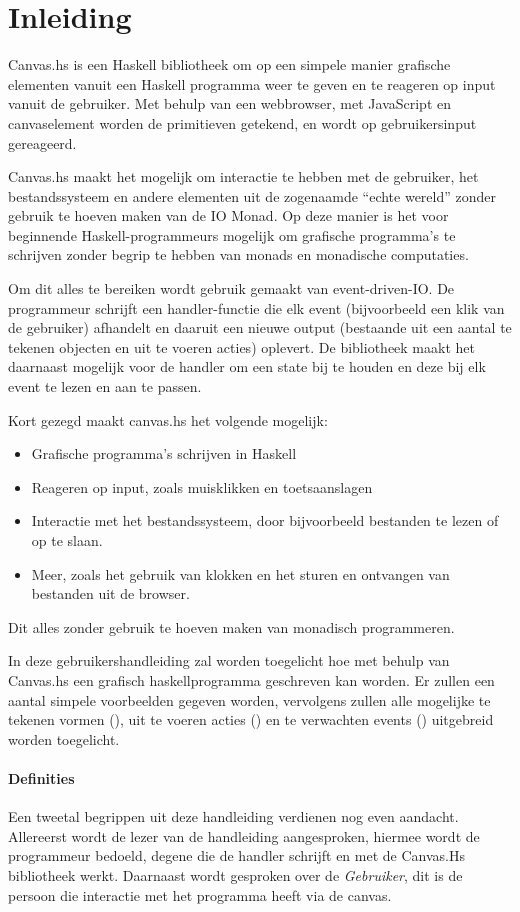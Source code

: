 \section{Inleiding}

Canvas.hs is een Haskell bibliotheek om op een simpele manier grafische elementen vanuit een Haskell programma weer te geven en te reageren op input vanuit de gebruiker. Met behulp van een webbrowser, met JavaScript en canvaselement worden de primitieven getekend, en wordt op gebruikersinput gereageerd.

Canvas.hs maakt het mogelijk om interactie te hebben met de gebruiker, het bestandssysteem en andere elementen uit de zogenaamde ``echte wereld'' zonder gebruik te hoeven maken van de IO Monad. Op deze manier is het voor beginnende Haskell-programmeurs mogelijk om grafische programma's te schrijven zonder begrip te hebben van monads en monadische computaties.

Om dit alles te bereiken wordt gebruik gemaakt van event-driven-IO. De programmeur schrijft een handler-functie die elk event (bijvoorbeeld een klik van de gebruiker) afhandelt en daaruit een nieuwe output (bestaande uit een aantal te tekenen objecten en uit te voeren acties) oplevert. De bibliotheek maakt het daarnaast mogelijk voor de handler om een state bij te houden en deze bij elk event te lezen en aan te passen. 

Kort gezegd maakt canvas.hs het volgende mogelijk:
\begin{itemize}
	\item Grafische programma's schrijven in Haskell
	\item Reageren op input, zoals muisklikken en toetsaanslagen
	\item Interactie met het bestandssysteem, door bijvoorbeeld bestanden te lezen of op te slaan.
	\item Meer, zoals het gebruik van klokken en het sturen en ontvangen van bestanden uit de browser.
\end{itemize}
Dit alles zonder gebruik te hoeven maken van monadisch programmeren. 

In deze gebruikershandleiding zal worden toegelicht hoe met behulp van Canvas.hs een grafisch haskellprogramma geschreven kan worden. Er zullen een aantal simpele voorbeelden gegeven worden, vervolgens zullen alle mogelijke te tekenen vormen (\shapes), uit te voeren acties (\actions) en te verwachten events (\events) uitgebreid worden toegelicht. 

\paragraph{Definities} 
Een tweetal begrippen uit deze handleiding verdienen nog even aandacht. Allereerst wordt de lezer van de handleiding aangesproken, hiermee wordt de programmeur bedoeld, degene die de handler schrijft en met de Canvas.Hs bibliotheek werkt. Daarnaast wordt gesproken over de \emph{Gebruiker}, dit is de persoon die interactie met het programma heeft via de canvas.
